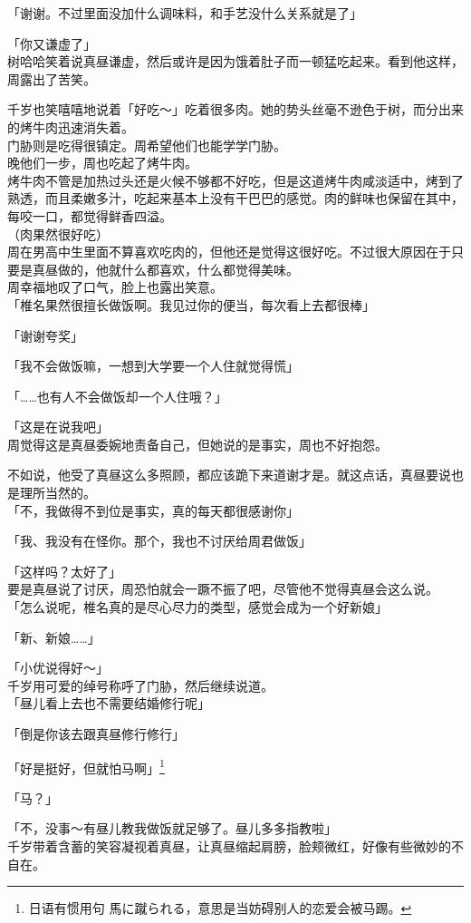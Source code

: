 「谢谢。不过里面没加什么调味料，和手艺没什么关系就是了」

「你又谦虚了」\\

树哈哈笑着说真昼谦虚，然后或许是因为饿着肚子而一顿猛吃起来。看到他这样，周露出了苦笑。

千岁也笑嘻嘻地说着「好吃～」吃着很多肉。她的势头丝毫不逊色于树，而分出来的烤牛肉迅速消失着。\\

门胁则是吃得很镇定。周希望他们也能学学门胁。\\

晚他们一步，周也吃起了烤牛肉。\\

烤牛肉不管是加热过头还是火候不够都不好吃，但是这道烤牛肉咸淡适中，烤到了熟透，而且柔嫩多汁，吃起来基本上没有干巴巴的感觉。肉的鲜味也保留在其中，每咬一口，都觉得鲜香四溢。\\

（肉果然很好吃）\\

周在男高中生里面不算喜欢吃肉的，但他还是觉得这很好吃。不过很大原因在于只要是真昼做的，他就什么都喜欢，什么都觉得美味。\\

周幸福地叹了口气，脸上也露出笑意。\\

「椎名果然很擅长做饭啊。我见过你的便当，每次看上去都很棒」

「谢谢夸奖」

「我不会做饭嘛，一想到大学要一个人住就觉得慌」

「……也有人不会做饭却一个人住哦？」

「这是在说我吧」\\

周觉得这是真昼委婉地责备自己，但她说的是事实，周也不好抱怨。

不如说，他受了真昼这么多照顾，都应该跪下来道谢才是。就这点话，真昼要说也是理所当然的。\\

「不，我做得不到位是事实，真的每天都很感谢你」

「我、我没有在怪你。那个，我也不讨厌给周君做饭」

「这样吗？太好了」\\

要是真昼说了讨厌，周恐怕就会一蹶不振了吧，尽管他不觉得真昼会这么说。\\

「怎么说呢，椎名真的是尽心尽力的类型，感觉会成为一个好新娘」

「新、新娘……」

「小优说得好～」\\

千岁用可爱的绰号称呼了门胁，然后继续说道。\\

「昼儿看上去也不需要结婚修行呢」

「倒是你该去跟真昼修行修行」

「好是挺好，但就怕马啊」\footnote{日语有惯用句 {\jpfont 馬に蹴られる}，意思是当妨碍别人的恋爱会被马踢。}

「马？」

「不，没事～有昼儿教我做饭就足够了。昼儿多多指教啦」\\

千岁带着含蓄的笑容凝视着真昼，让真昼缩起肩膀，脸颊微红，好像有些微妙的不自在。
